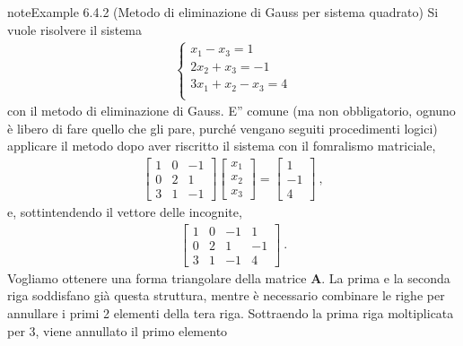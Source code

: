 \documentclass[letterpaper,10pt,italian]{jupyterBook}
\begin{document}
\begin{sphinxadmonition}{note}{Example 6.4.2 (Metodo di eliminazione di Gauss per sistema quadrato)}
\sphinxAtStartPar
Si vuole risolvere il sistema
\begin{equation*}
\begin{split}\begin{cases}
      x_1             - x_3 = 1 \\
                2 x_2 + x_3 =-1 \\
    3 x_1   +     x_2 - x_3 = 4 \\
\end{cases}\end{split}
\end{equation*}
\sphinxAtStartPar
con il metodo di eliminazione di Gauss. E” comune (ma non obbligatorio, ognuno è libero di fare quello che gli pare, purché vengano seguiti procedimenti logici) applicare il metodo dopo aver riscritto il sistema con il fomralismo matriciale,
\begin{equation*}
\begin{split}
\begin{bmatrix} 1 & 0 & -1 \\ 0 & 2 & 1 \\ 3 &  1 & -1 \end{bmatrix} \begin{bmatrix} x_1 \\ x_2 \\ x_3 \end{bmatrix} =  \begin{bmatrix} 1 \\ -1 \\ 4 \end{bmatrix} \ ,
\end{split}
\end{equation*}
\sphinxAtStartPar
e, sottintendendo il vettore delle incognite,
\begin{equation*}
\begin{split}\left[\begin{array}{ccc|c} 1 & 0 & -1 & 1 \\ 0 & 2 & 1 & -1 \\ 3 & 1 & -1 & 4 \end{array} \right] \ .\end{split}
\end{equation*}
\sphinxAtStartPar
Vogliamo ottenere una forma triangolare della matrice \(\mathbf{A}\). La prima e la seconda riga soddisfano già questa struttura, mentre è necessario combinare le righe per annullare i primi 2 elementi della tera riga. Sottraendo la prima riga moltiplicata per 3, viene annullato il primo elemento
\begin{equation*}

\end{equation*}
\end{sphinxadmonition}
\end{document}
